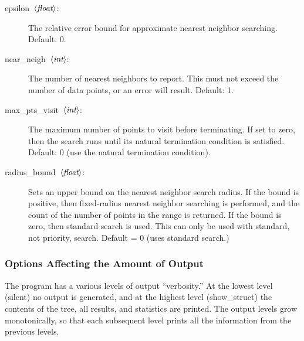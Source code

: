 \documentclass[11pt]{article}		%
\newcommand\ang[1]{\langle #1\rangle}
\newcommand{\INT}[0]{$\ang{\textit{int}\/}$}
\newcommand{\FLOAT}[0]{$\ang{\textit{float}\/}$}
\begin{document}
\begin{description}
\item[\hbox{\sf epsilon \FLOAT:}]
	The relative error bound for approximate nearest neighbor searching.
	Default: 0.
\item[\hbox{\sf near\_neigh \INT:}]
	The number of nearest neighbors to report.  This must not exceed the
	number of data points, or an error will result.  Default: 1.
\item[\hbox{\sf max\_pts\_visit \INT:}]
	The maximum number of points to visit before terminating.  If set
	to zero, then the search runs until its natural termination
	condition is satisfied.  Default: 0 (use the natural termination
	condition).
\item[\hbox{\sf radius\_bound \FLOAT:}]
	Sets an upper bound on the nearest neighbor search radius.  If the
	bound is positive, then fixed-radius nearest neighbor searching is
	performed, and the count of the number of points in the range is
	returned.  If the bound is zero, then standard search is used.  This
	can only be used with standard, not priority, search.  Default = 0
	(uses standard search.)
\end{description}

\subsubsection{Options Affecting the Amount of Output}

The program has a various levels of output ``verbosity.''  At the
lowest level (\textsf{silent}) no output is generated, and at the highest
level (\textsf{show\_struct}) the contents of the tree, all results, and
statistics are printed.  The output levels grow monotonically, so that
each subsequent level prints all the information from the previous levels.
\end{document}
